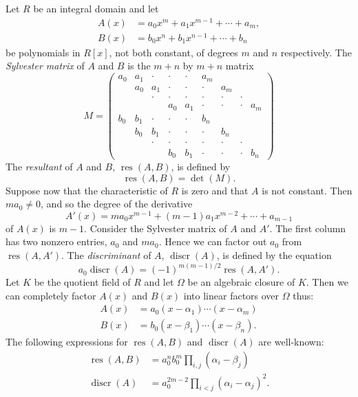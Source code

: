 \documentclass[11pt]{article}
\theoremstyle{plain}
\theoremstyle{definition}
\DeclareMathOperator{\res}{res}
\DeclareMathOperator{\discr}{discr}
\begin{document}
Let $R$ be an integral domain and let
\[
\begin{aligned}
A(x) &= a_0 x^m + a_1 x^{m-1} + \cdots + a_m, \\
B(x) &= b_0 x^n + b_1 x^{n-1} + \cdots + b_n
\end{aligned}
\]
be polynomials in $R[x]$, not both constant, of degrees $m$ and $n$
respectively. The \emph{Sylvester matrix} of $A$ and $B$ is the
$m+n$ by $m+n$ matrix
\[
M =
\begin{pmatrix}
a_0 & a_1 & \cdot & \cdot & \cdot & a_m & & & \\
& a_0 & a_1 & \cdot & \cdot & \cdot & a_m & & \\
& & \cdot & \cdot & \cdot & \cdot & \cdot & \cdot & \\
& & & a_0 & a_1 & \cdot & \cdot & \cdot & a_m \\
b_0 & b_1 & \cdot & \cdot & \cdot & b_n & & & \\
& b_0 & b_1 & \cdot & \cdot & \cdot & b_n & & \\
& & \cdot & \cdot & \cdot & \cdot & \cdot & \cdot & \\
& & & b_0 & b_1 & \cdot & \cdot & \cdot & b_n
\end{pmatrix}
\]
The \emph{resultant} of $A$ and $B$, $\res(A, B)$, is defined by
\[
\res(A, B) = \det(M).
\]
Suppose now that the characteristic of $R$ is zero and that $A$ is not
constant. Then $m a_0 \ne 0$, and so the degree of the derivative
\[
A'(x) = m a_0 x^{m-1} + (m-1) a_1 x^{m-2} + \cdots + a_{m-1}
\]
of $A(x)$ is $m - 1$. Consider the Sylvester matrix of $A$ and $A'$.
The first column has two nonzero entries, $a_0$ and $m a_0$. Hence we
can factor out $a_0$ from $\res(A, A')$. The \emph{discriminant} of
$A$, $\discr(A)$, is defined by the equation
\[
a_0 \discr(A) = (-1)^{m(m-1)/2} \res(A, A').
\]
Let $K$ be the quotient field of $R$ and let $\Omega$ be an algebraic
closure of $K$. Then we can completely factor $A(x)$ and $B(x)$ into
linear factors over $\Omega$ thus:
\begin{align}
A(x) &= a_0 (x - \alpha_1) \cdots (x - \alpha_m) \tag{2.3.3} \\
B(x) &= b_0 (x - \beta_1) \cdots (x - \beta_n). \tag{2.3.4}
\end{align}
The following expressions for $\res(A, B)$ and $\discr(A)$ are
well-known:
\begin{align}
\res(A, B) &= a_0^n b_0^m \prod_{i, j} (\alpha_i - \beta_j)
\tag{2.3.5} \\
\discr(A) &= a_0^{2m-2} \prod_{i < j} (\alpha_i - \alpha_j)^2.
\tag{2.3.6}
\end{align}
\end{document}
